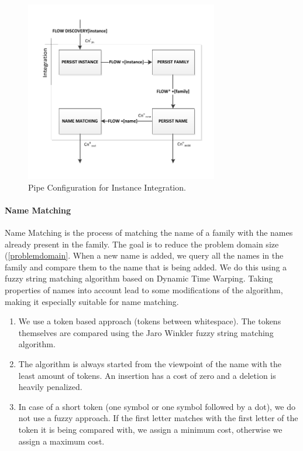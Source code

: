 \begin{figure}[htb]
	\centering
		\includegraphics[width=0.75\textwidth]{fig/integrationpipe}
	\caption{Pipe Configuration for Instance Integration.}
	\label{fig:integrationpipe}
\end{figure}

\paragraph{Name Matching} Name Matching is the process of matching the name of a family with the names already present in the family. The goal is to reduce the problem domain size (\autoref{problemdomain}. When a new name is added, we query all the names in the family and compare them to the name that is being added. We do this using a fuzzy string matching algorithm based on Dynamic Time Warping. Taking properties of names into account lead to some modifications of the algorithm, making it especially suitable for name matching.

\begin{enumerate}
\item We use a token based approach (tokens between whitespace). The tokens themselves are compared using the Jaro Winkler fuzzy string matching algorithm.
\item The algorithm is always started from the viewpoint of the name with the least amount of tokens. An insertion has a cost of zero and a deletion is heavily penalized.
\item In case of a short token (one symbol or one symbol followed by a dot), we do not use a fuzzy approach. If the first letter matches with the first letter of the token it is being compared with, we assign a minimum cost, otherwise we assign a maximum cost.
\end{enumerate}

